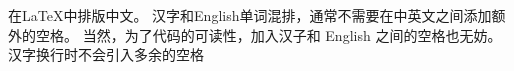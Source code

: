 \documentclass{ctexart}
\begin{document}
在\LaTeX{}中排版中文。
汉字和English单词混排，通常不需要在中英文之间添加额外的空格。
当然，为了代码的可读性，加入汉子和 English 之间的空格也无妨。
汉字换行时不会引入多余的空格
\end{document}
